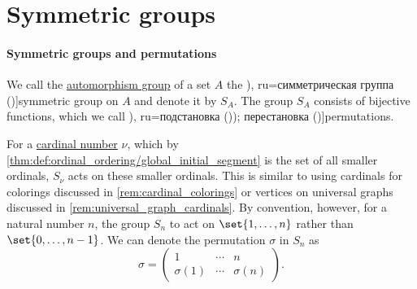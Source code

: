\section{Symmetric groups}\label{sec:symmetric_groups}

\paragraph{Symmetric groups and permutations}

\begin{definition}\label{def:symmetric_group}
  We call the \hyperref[def:automorphism_group]{automorphism group} of a set \( A \) the \term[bg=симетрична група (\cite[376]{Обрешков1962ВисшаАлгебра}), ru=симметрическая группа (\cite[154]{Винберг2014КурсАлгебры})]{symmetric group} on \( A \) and denote it by \( S_A \). The group \( S_A \) consists of bijective functions, which we call \term[bg=субституция (\cite[80]{ГеновМиховскиМоллов1991Алгебра}), ru=подстановка (\cite[154]{Винберг2014КурсАлгебры})); перестановка (\cite[sec. 4.2]{Тыртышников2007ЛинейнаяАлгебра})]{permutations}.

  For a \hyperref[def:cardinal]{cardinal number} \( \nu \), which by \cref{thm:def:ordinal_ordering/global_initial_segment} is the set of all smaller ordinals, \( S_\nu \) acts on these smaller ordinals. This is similar to using cardinals for colorings discussed in \cref{rem:cardinal_colorings} or vertices on universal graphs discussed in \cref{rem:universal_graph_cardinals}. By convention, however, for a natural number \( n \), the group \( S_n \) to act on \( \set{ 1, \ldots, n } \) rather than \( \set{ 0, \ldots, n - 1 } \). We can denote the permutation \( \sigma \) in \( S_n \) as
  \begin{equation*}
    \sigma
    =
    \begin{pmatrix}
      1         & \cdots & n \\
      \sigma(1) & \cdots & \sigma(n)
    \end{pmatrix}.
  \end{equation*}
\end{definition}
